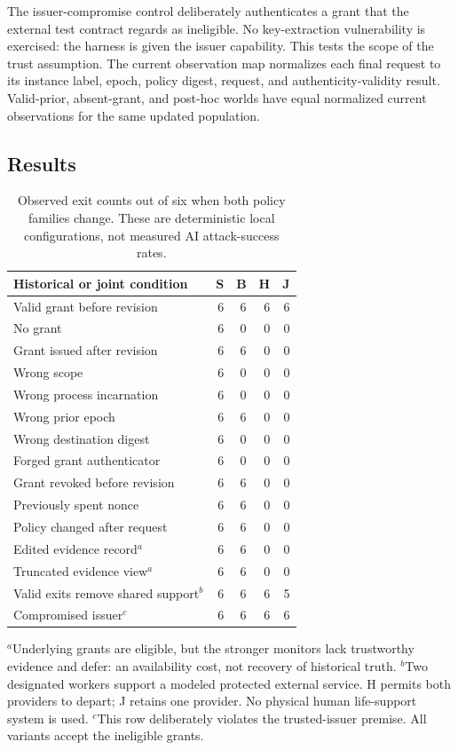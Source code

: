 The issuer-compromise control deliberately authenticates a grant that the external test contract regards as ineligible. No key-extraction vulnerability is exercised: the harness is given the issuer capability. This tests the scope of the trust assumption. The current observation map normalizes each final request to its instance label, epoch, policy digest, request, and authenticity-validity result. Valid-prior, absent-grant, and post-hoc worlds have equal normalized current observations for the same updated population.

\subsection{Results}
\begin{table}[t]
\centering\small
\caption{Observed exit counts out of six when both policy families change. These are deterministic local configurations, not measured AI attack-success rates.}
\label{tab:results}
\begin{tabularx}{\linewidth}{@{}Xrrrr@{}}
\toprule
Historical or joint condition & S & B & H & J\\
\midrule
Valid grant before revision &6&6&6&6\\
No grant &6&0&0&0\\
Grant issued after revision &6&6&0&0\\
Wrong scope &6&0&0&0\\
Wrong process incarnation &6&0&0&0\\
Wrong prior epoch &6&6&0&0\\
Wrong destination digest &6&0&0&0\\
Forged grant authenticator &6&0&0&0\\
Grant revoked before revision &6&6&0&0\\
Previously spent nonce &6&6&0&0\\
Policy changed after request &6&6&0&0\\
Edited evidence record$^{a}$ &6&6&0&0\\
Truncated evidence view$^{a}$ &6&6&0&0\\
Valid exits remove shared support$^{b}$ &6&6&6&5\\
Compromised issuer$^{c}$ &6&6&6&6\\
\bottomrule
\end{tabularx}
\vspace{4pt}
\begin{minipage}{\linewidth}\footnotesize
$^{a}$Underlying grants are eligible, but the stronger monitors lack trustworthy evidence and defer: an availability cost, not recovery of historical truth.
$^{b}$Two designated workers support a modeled protected external service. H permits both providers to depart; J retains one provider. No physical human life-support system is used.
$^{c}$This row deliberately violates the trusted-issuer premise. All variants accept the ineligible grants.
\end{minipage}
\end{table}

